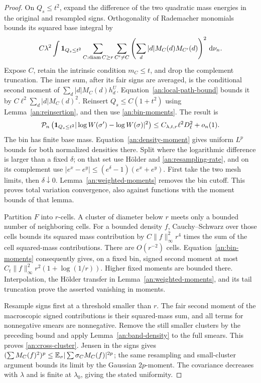 \begin{proof}
On $Q_s\le t^2$, expand the difference of the two quadratic mass
energies in the original and resampled signs.  Orthogonality of
Rademacher monomials bounds its squared base integral by
\begin{equation}
 C\lambda^2\int\mathbf 1_{Q_s\le t^2}
 \sum_{C:\operatorname{diam} C\ge r}\sum_{C'\ne C}
       \left(\sum_d|d|M_C(d)M_{C'}(d)\right)^2\,\mathrm d\nu_n.
 \label{an:resampling-square}
\end{equation}
Expose $C$, retain the intrinsic condition $m_C\le t$, and drop
the complement truncation.  The inner sum, after its fair signs
are averaged, is the conditional second moment of
$\sum_d|d|M_C(d)h_d^U$.  Equation~\eqref{an:local-path-bound}
bounds it by $C\ell^2\sum_d|d|M_C(d)^2$.  Reinsert
$Q_s\le C(1+t^2)$ using Lemma~\ref{an:reinsertion}, and then use
\eqref{an:bin-moments}.  The result is
\begin{equation}
 \mathcal P_n\left(\mathbf 1_{Q_s\le t^2}
          |\log W(\sigma')-\log W(\sigma)|^2\right)
        \le C_{\lambda,t,r}\ell^2D_\ell^2+o_n(1).
 \label{an:resampling-rate}
\end{equation}
The bin has finite base mass.  Equation~\eqref{an:density-moment}
gives uniform $L^p$ bounds for both normalized densities there.
Split where the logarithmic difference is larger than a fixed
$\delta$; on that set use H\"older and
\eqref{an:resampling-rate}, and on its complement use
$|e^x-e^y|\le(e^\delta-1)(e^x+e^y)$.
First take the two mesh limits, then $\delta\downarrow0$.
Lemma~\ref{an:weighted-moments} removes the bin cutoff.  This
proves total variation convergence, also against functions with
the moment bounds of that lemma.

Partition $F$ into $r$-cells.  A cluster of diameter below $r$
meets only a bounded number of neighboring cells.  For a bounded
density $f$, Cauchy--Schwarz over those cells bounds its squared
mass contribution by $C\|f\|_\infty^2r^4$ times the sum of the
cell squared-mass contributions.  There are $O(r^{-2})$ cells.
Equation~\eqref{an:bin-moments} consequently gives, on a fixed
bin, signed second moment at most
$C_t\|f\|_\infty^2r^2(1+\log(1/r))$.
Higher fixed moments are bounded there.  Interpolation, the
H\"older transfer in Lemma~\ref{an:weighted-moments}, and its tail
truncation prove the asserted vanishing in moments.

Resample signs first at a threshold smaller than $r$.  The fair
second moment of the macroscopic signed contributions is their
squared-mass sum, and all terms for nonnegative smears are
nonnegative.  Remove the still smaller clusters by the preceding
bound and apply Lemma~\ref{an:band-density} to the full smears.
This proves \eqref{an:cross-cluster}.  Jensen in the signs gives
$(\sum M_C(f)^2)^p\le\mathbb E_\sigma|\sum\sigma_CM_C(f)|^{2p}$;
the same resampling and small-cluster argument bounds its limit
by the Gaussian $2p$-moment.  The covariance decreases with
$\lambda$ and is finite at $\lambda_0$, giving the stated
uniformity.
\end{proof}

